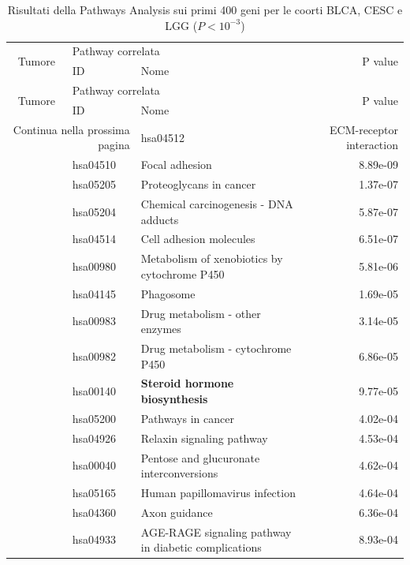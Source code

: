 \begin{longtable}{cllr}
\caption{Risultati della Pathways Analysis sui primi 400 geni per le coorti BLCA, CESC e LGG ($P < 10^{-3}$)} \\
\toprule
\multirow{2}{*}{Tumore} & \multicolumn{2}{l}{Pathway correlata} & \multirow{2}{*}{P value} \\
& ID & Nome \\
\midrule
\endfirsthead
\toprule
\multirow{2}{*}{Tumore} & \multicolumn{2}{l}{Pathway correlata} & \multirow{2}{*}{P value} \\
& ID & Nome \\
\midrule
\endhead
\midrule
\multicolumn{2}{r}{Continua nella prossima pagina}
\endfoot
\bottomrule
\endlastfoot
\rowcolor{\clrmatch} BLCA & hsa04512 & ECM-receptor interaction & 4.05e-09\\ 
\rowcolor{\clrmatch}& hsa04510 & Focal adhesion & 8.89e-09 \\ 
 & hsa05205 & \textcolor{\clrnew}{Proteoglycans in cancer} & 1.37e-07 \\ 
 & hsa05204 & \textcolor{\clrnew}{Chemical carcinogenesis - DNA adducts} & 5.87e-07 \\ 
 & hsa04514 & \textcolor{\clrnew}{Cell adhesion molecules} & 6.51e-07 \\ 
 \rowcolor{\clrmatch} & hsa00980 & Metabolism of xenobiotics by cytochrome P450 & 5.81e-06 \\ 
 & hsa04145 & \textcolor{\clrnew}{Phagosome} & 1.69e-05 \\ 
 & hsa00983 & \textcolor{\clrnew}{Drug metabolism - other enzymes} & 3.14e-05 \\ 
 & hsa00982 & \textcolor{\clrnew}{Drug metabolism - cytochrome P450} & 6.86e-05 \\ 
 \rowcolor{\clrpath} & hsa00140 & \textbf{Steroid hormone biosynthesis} & 9.77e-05 \\ 
 & hsa05200 & \textcolor{\clrnew}{Pathways in cancer} & 4.02e-04 \\ 
 & hsa04926 & \textcolor{\clrnew}{Relaxin signaling pathway} & 4.53e-04 \\ 
 & hsa00040 & \textcolor{\clrnew}{Pentose and glucuronate interconversions} & 4.62e-04 \\ 
 & hsa05165 & \textcolor{\clrnew}{Human papillomavirus infection} & 4.64e-04 \\ 
 & hsa04360 & \textcolor{\clrnew}{Axon guidance} & 6.36e-04 \\ 
 & hsa04933 & \textcolor{\clrnew}{AGE-RAGE signaling pathway in diabetic complications} & 8.93e-04 \\ 

\end{longtable}
